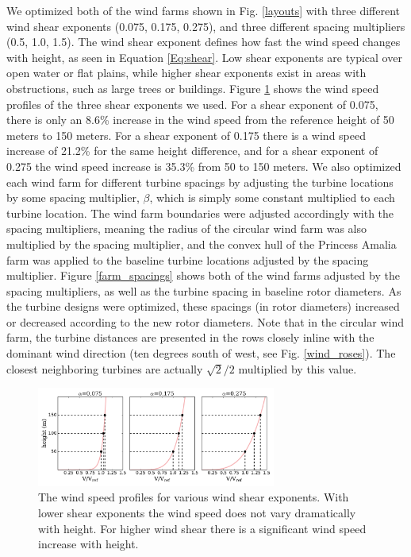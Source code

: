 \documentclass[WESD, manuscript]{copernicus}
\begin{document}
We optimized both of the wind farms shown in Fig. \ref{layouts} with three different wind shear exponents (0.075, 0.175, 0.275), and three different spacing multipliers (0.5, 1.0, 1.5). The wind shear exponent defines how fast the wind speed changes with height, as seen in Equation \ref{Eq:shear}. Low shear exponents are typical over open water or flat plains, while higher shear exponents exist in areas with obstructions, such as large trees or buildings. Figure \ref{shear_profile} shows the wind speed profiles of the three shear exponents we used. For a shear exponent of 0.075, there is only an 8.6\% increase in the wind speed from the reference height of 50 meters to 150 meters. For a shear exponent of 0.175 there is a wind speed increase of 21.2\% for the same height difference, and for a shear exponent of 0.275 the wind speed increase is 35.3\% from 50 to 150 meters. We also optimized each wind farm for different turbine spacings by adjusting the turbine locations by some spacing multiplier, $\beta$, which is simply some constant multiplied to each turbine location. The wind farm boundaries were adjusted accordingly with the spacing multipliers, meaning the radius of the circular wind farm was also multiplied by the spacing multiplier, and the convex hull of the Princess Amalia farm was applied to the baseline turbine locations adjusted by the spacing multiplier. Figure \ref{farm_spacings} shows both of the wind farms adjusted by the spacing multipliers, as well as the turbine spacing in baseline rotor diameters. As the turbine designs were optimized, these spacings (in rotor diameters) increased or decreased according to the new rotor diameters. Note that in the circular wind farm, the turbine distances are presented in the rows closely inline with the dominant wind direction (ten degrees south of west, see Fig. \ref{wind_roses}). The closest neighboring turbines are actually $\sqrt{2}/2$ multiplied by this value. 


\begin{figure}[htbp]
  \centering
  \includegraphics[width=0.7\textwidth]{Figures/shears.pdf}
  \caption{\label{shear_profile}The wind speed profiles for various wind shear exponents. With lower shear exponents the wind speed does not vary dramatically with height. For higher wind shear there is a significant wind speed increase with height.}
\end{figure}
\end{document}
